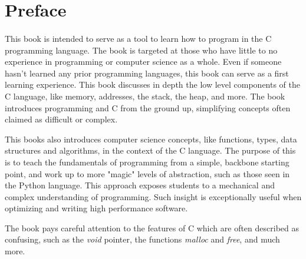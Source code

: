 
\section{Preface}
\paragraph{   } This book is intended to serve as a tool to learn how to program in the C programming language. The book is targeted at those who have little to no experience in programming or computer science as a whole. Even if someone hasn't learned any prior programming languages, this book can serve as a first learning experience. This book discusses in depth the low level components of the C language, like memory, addresses, the stack, the heap, and more. The book introduces programming and C from the ground up, simplifying concepts often claimed as difficult or complex.

\par This books also introduces computer science concepts, like functions, types, data structures and algorithms, in the context of the C language. The purpose of this is to teach the fundamentals of programming from a simple, backbone starting point, and work up to more "magic" levels of abstraction, such as those seen in the Python language. This approach exposes students to a mechanical and complex understanding of programming. Such insight is exceptionally useful when optimizing and writing high performance software.

\par The book pays careful attention to the features of C which are often described as confusing, such as the \textit{void} pointer, the functions \textit{malloc} and \textit{free}, and much more.